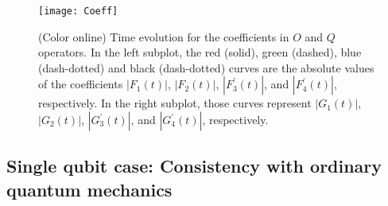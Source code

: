 \documentclass[preprint]{elsarticle}
\begin{document}
\noindent 
\begin{figure}
\begin{centering}
\texttt{[image: Coeff]}
\par\end{centering}

\caption{\label{Coeff}(Color online) Time evolution for the coefficients in
$O$ and $Q$ operators. In the left subplot, the red (solid), green
(dashed), blue (dash-dotted) and black (dash-dotted) curves are the
absolute values of the coefficients $|F_{1}(t)|$, $|F_{2}(t)|$,
$|F_{3}^{\prime}(t)|$, and $|F_{4}^{\prime}(t)|$, respectively.
In the right subplot, those curves represent $|G_{1}(t)|$, $|G_{2}(t)|$,
$|G_{3}^{\prime}(t)|$, and $|G_{4}^{\prime}(t)|$, respectively.}
\end{figure}



\subsection{Single qubit case: Consistency with ordinary quantum mechanics}
\end{document}
